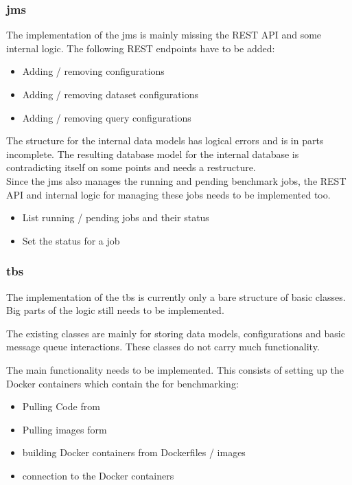 \subsubsection{\acl{jms}}
The implementation of the \acl{jms} is mainly missing the REST API and some internal logic.
The following REST endpoints have to be added:

\begin{itemize}
	\item Adding / removing \ts{} configurations
	
	\item Adding / removing dataset configurations
	
	\item Adding / removing query configurations
\end{itemize}

The structure for the internal data models has logical errors and is in parts incomplete.
The resulting database model for the internal database is contradicting itself on some points and needs a restructure.
\\

Since the \ac{jms} also manages the running and pending benchmark jobs, the REST API and internal logic for managing these jobs needs to be implemented too.

\begin{itemize}
	\item List running / pending jobs and their status
	
	\item Set the status for a job
\end{itemize}



\subsubsection{\acl{tbs}}
The implementation of the \acl{tbs} is currently only a bare structure of basic classes.
Big parts of the logic still needs to be implemented.

The existing classes are mainly for storing data models, configurations and basic message queue interactions.
These classes do not carry much functionality.

The main functionality needs to be implemented.
This consists of setting up the Docker containers which contain the \tsp{} for benchmarking:

\begin{itemize}
	\item Pulling Code from \gh{}
	\item Pulling images form \dockh{}
	
	\item building Docker containers from Dockerfiles / images
	
	\item connection to the Docker containers
\end{itemize}

